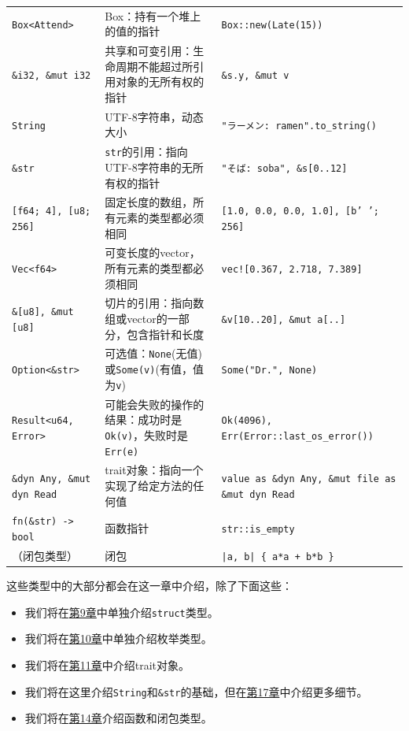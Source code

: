 \begin{longtable}{p{}p{}p{}}
    \texttt{Box<Attend>}                             & Box：持有一个堆上的值的指针   & \texttt{Box::new(Late(15))} \\
    \texttt{\&i32, \&mut i32}                       & 共享和可变引用：生命周期不能超过所引用对象的无所有权的指针 & \texttt{\&s.y, \&mut v} \\
    \rowcolor{tablecolor}
    \texttt{String}                                 & UTF-8字符串，动态大小         & \texttt{"ラーメン: ramen"\newline.to\_string()} \\
    \texttt{\&str}                                  & \texttt{str}的引用：指向UTF-8字符串的无所有权的指针 & \texttt{"そば: soba", \&s[0..12]} \\
    \rowcolor{tablecolor}
    \texttt{[f64; 4], [u8; 256]}                    & 固定长度的数组，所有元素的类型都必须相同   & \texttt{[1.0, 0.0, 0.0, 1.0], [b' '; 256]} \\
    \texttt{Vec<f64>}                               & 可变长度的vector，所有元素的类型都必须相同 & \texttt{vec![0.367, 2.718, 7.389]} \\
    \rowcolor{tablecolor}
    \texttt{\&[u8], \&mut [u8]}                     & 切片的引用：指向数组或vector的一部分，包含指针和长度 & \texttt{\&v[10..20], \&mut a[..]} \\
    \texttt{Option<\&str>}      & 可选值：\texttt{None}(无值)或\texttt{Some(v)}(有值，值为\texttt{v})   & \texttt{Some("Dr.", None)} \\
    \rowcolor{tablecolor}
    \texttt{Result<u64, Error>} & 可能会失败的操作的结果：成功时是\texttt{Ok(v)}，失败时是\texttt{Err(e)} & \texttt{Ok(4096), Err(Error::last\_os\_error())} \\
    \texttt{\&dyn Any, \&mut dyn Read}  & trait对象：指向一个实现了给定方法的任何值 & \texttt{value as \&dyn Any, \&mut file as \&mut dyn Read} \\
    \rowcolor{tablecolor}
    \texttt{fn(\&str) -> bool}          & 函数指针      & \texttt{str::is\_empty}           \\
    （闭包类型）                         & 闭包         & \texttt{|a, b| \{ a*a + b*b \}}    \\
\end{longtable}

这些类型中的大部分都会在这一章中介绍，除了下面这些：
\begin{itemize}
    \item 我们将在\hyperref[ch09]{第9章}中单独介绍\texttt{struct}类型。
    \item 我们将在\hyperref[ch10]{第10章}中单独介绍枚举类型。
    \item 我们将在\hyperref[ch11]{第11章}中介绍trait对象。
    \item 我们将在这里介绍\texttt{String}和\texttt{\&str}的基础，但在\hyperref[ch17]{第17章}中介绍更多细节。
    \item 我们将在\hyperref[ch14]{第14章}介绍函数和闭包类型。
\end{itemize}

